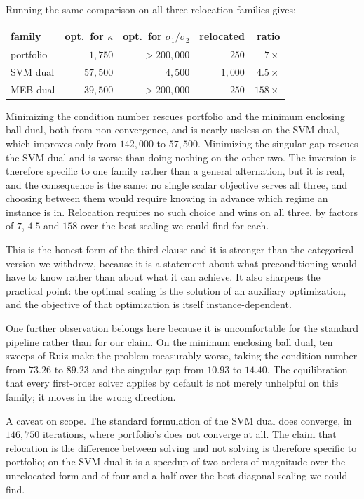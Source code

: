 \documentclass[11pt]{article}
\begin{document}
Running the same comparison on all three relocation families gives:

\begin{center}
\begin{tabular}{lrrrr}
\toprule
family & opt.\ for $\kappa$ & opt.\ for $\sigma_1/\sigma_2$ & relocated & ratio \\
\midrule
portfolio & $1{,}750$  & $>200{,}000$ & $250$   & $7\times$ \\
SVM dual  & $57{,}500$ & $4{,}500$    & $1{,}000$ & $4.5\times$ \\
MEB dual  & $39{,}500$ & $>200{,}000$ & $250$   & $158\times$ \\
\bottomrule
\end{tabular}
\end{center}

Minimizing the condition number rescues portfolio and the minimum enclosing
ball dual, both from non-convergence, and is nearly useless on the SVM dual,
which improves only from $142{,}000$ to $57{,}500$. Minimizing the singular
gap rescues the SVM dual and is worse than doing nothing on the other two.
The inversion is therefore specific to one family rather than a general
alternation, but it is real, and the consequence is the same: no single
scalar objective serves all three, and choosing between them would require
knowing in advance which regime an instance is in. Relocation requires no
such choice and wins on all three, by factors of $7$, $4.5$ and $158$ over
the best scaling we could find for each.

This is the honest form of the third clause and it is stronger than the
categorical version we withdrew, because it is a statement about what
preconditioning would have to know rather than about what it can achieve. It
also sharpens the practical point: the optimal scaling is the solution of an
auxiliary optimization, and the objective of that optimization is itself
instance-dependent.

One further observation belongs here because it is uncomfortable for the
standard pipeline rather than for our claim. On the minimum enclosing ball
dual, ten sweeps of Ruiz make the problem measurably worse, taking the
condition number from $73.26$ to $89.23$ and the singular gap from $10.93$ to
$14.40$. The equilibration that every first-order solver applies by default
is not merely unhelpful on this family; it moves in the wrong direction.

A caveat on scope. The standard formulation of the SVM dual does converge,
in $146{,}750$ iterations, where portfolio's does not converge at all. The
claim that relocation is the difference between solving and not solving is
therefore specific to portfolio; on the SVM dual it is a speedup of two
orders of magnitude over the unrelocated form and of four and a half over
the best diagonal scaling we could find.
\end{document}
